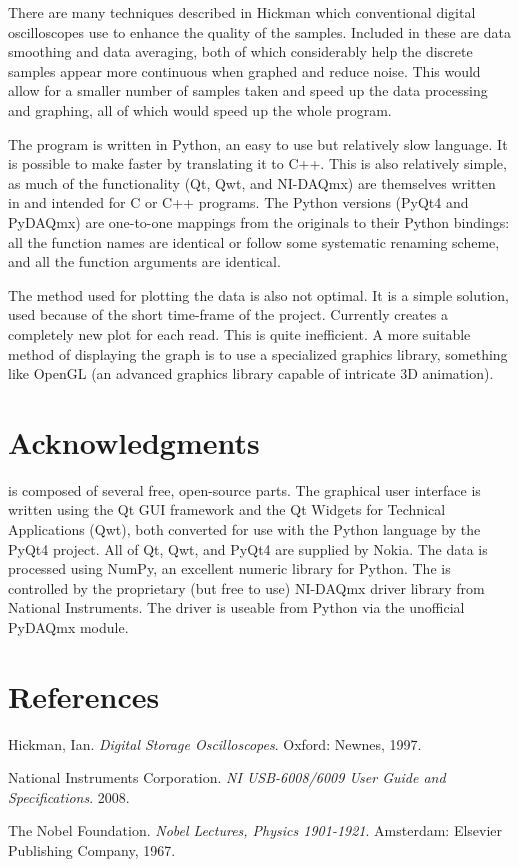 \documentclass[12pt,reqno]{amsart}
\begin{document}
There are many techniques described in Hickman\hickman{} which conventional digital oscilloscopes use to enhance the quality of the samples. Included in these are data smoothing and data averaging, both of which considerably help the discrete samples appear more continuous when graphed and reduce noise. This would allow for a smaller number of samples taken and speed up the data processing and graphing, all of which would speed up the whole program.

The program is written in Python, an easy to use but relatively slow language. It is possible to make \progname{} faster by translating it to C++. This is also relatively simple, as much of the functionality (Qt, Qwt, and NI-DAQmx) are themselves written in and intended for C or C++ programs. The Python versions (PyQt4 and PyDAQmx) are one-to-one mappings from the originals to their Python bindings: all the function names are identical or follow some systematic renaming scheme, and all the function arguments are identical.

The method used for plotting the data is also not optimal. It is a simple solution, used because of the short time-frame of the project. Currently \progname{} creates a completely new plot for each read. This is quite inefficient. A more suitable method of displaying the graph is to use a specialized graphics library, something like OpenGL (an advanced graphics library capable of intricate 3D animation).

\section{Acknowledgments}
\progname{} is composed of several free, open-source parts. The graphical user interface is written using the Qt GUI framework and the Qt Widgets for Technical Applications (Qwt), both converted for use with the Python language by the PyQt4 project. All of Qt, Qwt, and PyQt4 are supplied by Nokia. The data is processed using NumPy, an excellent numeric library for Python. The \device{} is controlled by the proprietary (but free to use) NI-DAQmx driver library from National Instruments. The driver is useable from Python via the unofficial PyDAQmx module.

\section{References}
\hickman Hickman, Ian. \textit{Digital Storage Oscilloscopes}. Oxford: Newnes, 1997.

\nidaq National Instruments Corporation. \textit{NI USB-6008/6009 User Guide and Specifications}. 2008.

\nobel The Nobel Foundation. \textit{Nobel Lectures, Physics 1901-1921}. Amsterdam: Elsevier Publishing Company, 1967.
\end{document}
